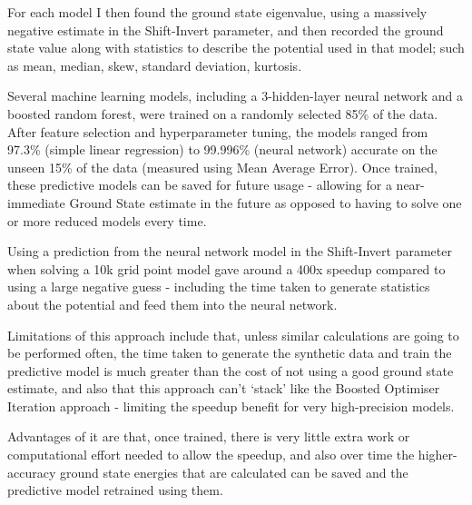 For each model I then found the ground state eigenvalue, using a massively negative estimate in the Shift-Invert parameter, and then recorded the ground state value along with statistics to describe the potential used in that model; such as mean, median, skew, standard deviation, kurtosis. 

Several machine learning models, including a 3-hidden-layer neural network and a boosted random forest, were trained on a randomly selected 85\% of the data. After feature selection and hyperparameter tuning, the models ranged from 97.3\% (simple linear regression) to 99.996\% (neural network) accurate on the unseen 15\% of the data (measured using Mean Average Error).
Once trained, these predictive models can be saved for future usage - allowing for a near-immediate Ground State estimate in the future as opposed to having to solve one or more reduced models every time. 

Using a prediction from the neural network model in the Shift-Invert parameter when solving a 10k grid point model gave around a 400x speedup compared to using a large negative guess - including the time taken to generate statistics about the potential and feed them into the neural network. 

Limitations of this approach include that, unless similar calculations are going to be performed often, the time taken to generate the synthetic data and train the predictive model is much greater than the cost of not using a good ground state estimate, and also that this approach can't `stack' like the Boosted Optimiser Iteration approach - limiting the speedup benefit for very high-precision models. 

Advantages of it are that, once trained, there is very little extra work or computational effort needed to allow the speedup, and also over time the higher-accuracy ground state energies that are calculated can be saved and the predictive model retrained using them.


